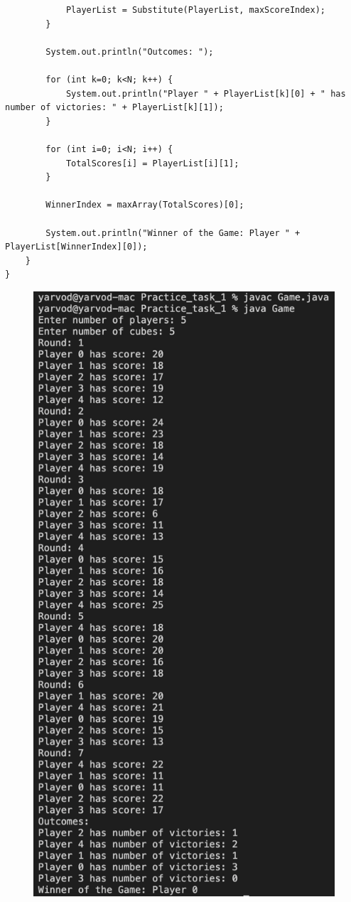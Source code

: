 \documentclass[a4paper]{article}
\begin{document}
\begin{lstlisting}
            PlayerList = Substitute(PlayerList, maxScoreIndex);
        }

        System.out.println("Outcomes: ");

        for (int k=0; k<N; k++) {
            System.out.println("Player " + PlayerList[k][0] + " has number of victories: " + PlayerList[k][1]);
        }
        
        for (int i=0; i<N; i++) {
            TotalScores[i] = PlayerList[i][1];
        }

        WinnerIndex = maxArray(TotalScores)[0];
        
        System.out.println("Winner of the Game: Player " + PlayerList[WinnerIndex][0]);
    }
}
\end{lstlisting}

\begin{figure}[H]
    \begin{center}
        \includegraphics[scale = 0.5]{solution_2.png}

\end{center}
\end{figure}
\end{document}
